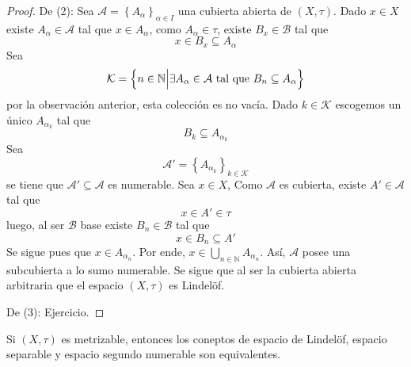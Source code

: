 \documentclass[12pt]{report}
\theoremstyle{largebreak}
\begin{document}
\begin{proof}
        De (2): Sea $\mathcal{A}=\left\{A_\alpha\right\}_{ \alpha\in I}$ una cubierta abierta de $(X,\tau)$. Dado $x\in X$ existe $A_\alpha\in\mathcal{A}$ tal que $x\in A_\alpha$, como $A_\alpha\in\tau$, existe $B_x\in\mathcal{B}$ tal que
        \begin{equation*}
            x\in B_x\subseteq A_\alpha
        \end{equation*}
        Sea
        \begin{equation*}
            \mathcal{K}=\left\{n\in\mathbb{N}\Big|\exists A_\alpha\in\mathcal{A}\textup{ tal que }B_n\subseteq A_\alpha \right\}
        \end{equation*}
        por la observación anterior, esta colección es no vacía. Dado $k\in\mathcal{K}$ escogemos un único $A_{\alpha_k}$ tal que
        \begin{equation*}
            B_k\subseteq A_{\alpha_k}
        \end{equation*}
        Sea
        \begin{equation*}
            \mathcal{A}'=\left\{A_{\alpha_k} \right\}_{ k\in\mathcal{K}}
        \end{equation*}
        se tiene que $\mathcal{A}'\subseteq\mathcal{A}$ es numerable. Sea $x\in X$, Como $\mathcal{A}$ es cubierta, existe $A'\in\mathcal{A}$ tal que
        \begin{equation*}
            x\in A'\in\tau
        \end{equation*}
        luego, al ser $\mathcal{B}$ base existe $B_n\in\mathcal{B}$ tal que
        \begin{equation*}
            x\in B_n\subseteq A'
        \end{equation*}
        Se sigue pues que $x\in A_{ \alpha_n}$. Por ende, $x\in\bigcup_{ n\in\mathbb{N}}A_{\alpha_n}$. Así, $\mathcal{A}$ posee una subcubierta a lo sumo numerable. Se sigue que al ser la cubierta abierta arbitraria que el espacio $(X,\tau)$ es Lindelöf.

        De (3): Ejercicio.
    \end{proof}

    \begin{propo}
        Si $(X,\tau)$ es metrizable, entonces los coneptos de espacio de Lindelöf, espacio separable y espacio segundo numerable son equivalentes.
    \end{propo}
\end{document}
